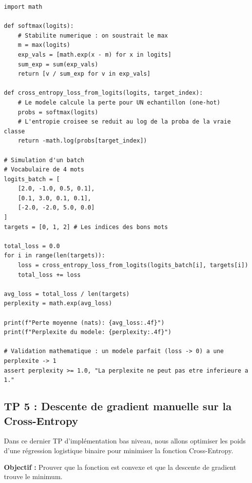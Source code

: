 \documentclass[11pt,a4paper]{article}
\begin{document}
\begin{lstlisting}
import math

def softmax(logits):
    # Stabilite numerique : on soustrait le max
    m = max(logits)
    exp_vals = [math.exp(x - m) for x in logits]
    sum_exp = sum(exp_vals)
    return [v / sum_exp for v in exp_vals]

def cross_entropy_loss_from_logits(logits, target_index):
    # Le modele calcule la perte pour UN echantillon (one-hot)
    probs = softmax(logits)
    # L'entropie croisee se reduit au log de la proba de la vraie classe
    return -math.log(probs[target_index])

# Simulation d'un batch
# Vocabulaire de 4 mots
logits_batch = [
    [2.0, -1.0, 0.5, 0.1],
    [0.1, 3.0, 0.1, 0.1],
    [-2.0, -2.0, 5.0, 0.0]
]
targets = [0, 1, 2] # Les indices des bons mots

total_loss = 0.0
for i in range(len(targets)):
    loss = cross_entropy_loss_from_logits(logits_batch[i], targets[i])
    total_loss += loss

avg_loss = total_loss / len(targets)
perplexity = math.exp(avg_loss)

print(f"Perte moyenne (nats): {avg_loss:.4f}")
print(f"Perplexite du modele: {perplexity:.4f}")

# Validation mathematique : un modele parfait (loss -> 0) a une perplexite -> 1
assert perplexity >= 1.0, "La perplexite ne peut pas etre inferieure a 1."
\end{lstlisting}


\subsection*{TP 5 : Descente de gradient manuelle sur la Cross-Entropy }


Dans ce dernier TP d'implémentation bas niveau, nous allons optimiser les poids d'une régression logistique binaire pour minimiser la fonction Cross-Entropy.

\textbf{Objectif :}
Prouver que la fonction est convexe et que la descente de gradient trouve le minimum.
\end{document}
